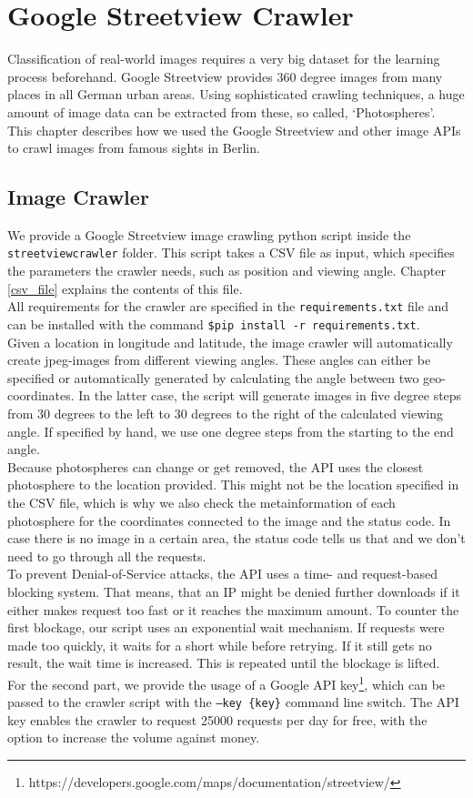 \section{Google Streetview Crawler}
Classification of real-world images requires a very big dataset for the learning process beforehand. Google Streetview provides 360 degree images from many places in all German urban areas. Using sophisticated crawling techniques, a huge amount of image data can be extracted from these, so called, `Photospheres'.\\
This chapter describes how we used the Google Streetview and other image APIs to crawl images from famous sights in Berlin.

\subsection{Image Crawler}
We provide a Google Streetview image crawling python script inside the \texttt{streetviewcrawler} folder. This script takes a CSV file as input, which specifies the parameters the crawler needs, such as position and viewing angle. Chapter \ref{csv_file} explains the contents of this file.\\
All requirements for the crawler are specified in the \texttt{requirements.txt} file and can be installed with the command \texttt{\$pip install -r requirements.txt}.\\
Given a location in longitude and latitude, the image crawler will automatically create jpeg-images from different viewing angles. These angles can either be specified or automatically generated by calculating the angle between two geo-coordinates. In the latter case, the script will generate images in five degree steps from 30 degrees to the left to 30 degrees to the right of the calculated viewing angle. If specified by hand, we use one degree steps from the starting to the end angle.\\
Because photospheres can change or get removed, the API uses the closest photosphere to the location provided. This might not be the location specified in the CSV file, which is why we also check the metainformation of each photosphere for the coordinates connected to the image and the status code. In case there is no image in a certain area, the status code tells us that and we don't need to go through all the requests.\\
To prevent Denial-of-Service attacks, the API uses a time- and request-based blocking system. That means, that an IP might be denied further downloads if it either makes request too fast or it reaches the maximum amount. To counter the first blockage, our script uses an exponential wait mechanism. If requests were made too quickly, it waits for a short while before retrying. If it still gets no result, the wait time is increased. This is repeated until the blockage is lifted.\\
For the second part, we provide the usage of a Google API key\footnote{https://developers.google.com/maps/documentation/streetview/}, which can be passed to the crawler script with the \texttt{--key \{key\}} command line switch. The API key enables the crawler to request 25000 requests per day for free, with the option to increase the volume against money.

